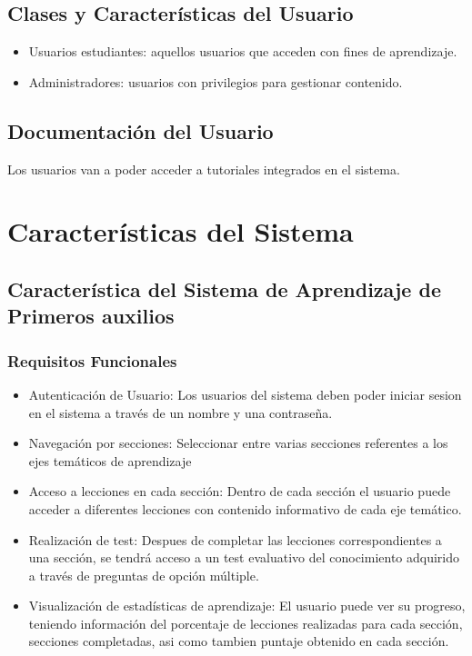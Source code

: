 \documentclass{article}
\begin{document}
    \subsection{Clases y Características del Usuario}
        \begin{itemize}
            \item Usuarios estudiantes: aquellos usuarios que acceden con fines de aprendizaje.
            \item Administradores: usuarios con privilegios para gestionar contenido.
        \end{itemize}
    \subsection{Documentación del Usuario}
        Los usuarios van a poder acceder a tutoriales integrados en el sistema.

\section{Características del Sistema}
    \subsection{Característica del Sistema de Aprendizaje de Primeros auxilios}
        \subsubsection{Requisitos Funcionales}
        \begin{itemize}
            \item Autenticación de Usuario: Los usuarios del sistema deben poder iniciar sesion en el sistema a través de un nombre y una contraseña.
            \item Navegación por secciones: Seleccionar entre varias secciones referentes a los ejes temáticos de aprendizaje
            \item Acceso a lecciones en cada sección: Dentro de cada sección el usuario puede acceder a diferentes lecciones con contenido informativo de cada eje temático.
            \item Realización de test: Despues de completar las lecciones correspondientes a una sección, se tendrá acceso a un test evaluativo del conocimiento adquirido a través de preguntas de opción múltiple.
            \item Visualización de estadísticas de aprendizaje: El usuario puede ver su progreso, teniendo información del porcentaje de lecciones realizadas para cada sección, secciones completadas, asi como tambien puntaje obtenido en cada sección.
        \end{itemize}
\end{document}
